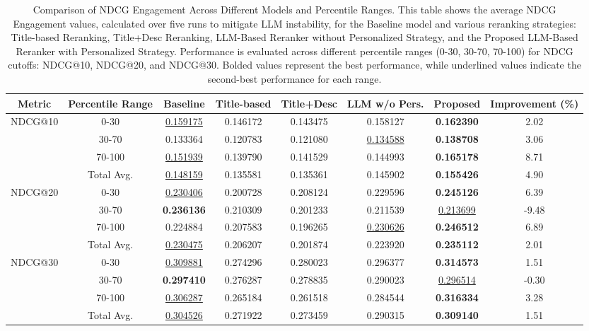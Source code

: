 \begin{table*}[ht]
\centering
\renewcommand{\arraystretch}{1.2} %
\begin{tabular}{|c|c|c|c|c|c|c|c|}
\hline
\textbf{Metric} & \textbf{Percentile Range} & \textbf{Baseline} & \textbf{Title-based} & \textbf{Title+Desc} & \textbf{LLM w/o Pers.} & \textbf{Proposed} & \textbf{Improvement (\%)} \\
\hline
\multirow{3}{*}{NDCG@10} & 0-30    & \underline{0.159175} & 0.146172 & 0.143475 & 0.158127 & \textbf{0.162390} & 2.02 \\
& 30-70   & 0.133364 & 0.120783 & 0.121080 & \underline{0.134588} & \textbf{0.138708} & 3.06 \\
& 70-100  & \underline{0.151939} & 0.139790 & 0.141529 & 0.144993 & \textbf{0.165178} & 8.71 \\
& Total Avg. & \underline{0.148159} & 0.135581 & 0.135361 & 0.145902 & \textbf{0.155426} & 4.90 \\
\hline
\multirow{3}{*}{NDCG@20} & 0-30    & \underline{0.230406} & 0.200728 & 0.208124 & 0.229596 & \textbf{0.245126} & 6.39 \\
& 30-70   & \textbf{0.236136} & 0.210309 & 0.201233 & 0.211539 & \underline{0.213699} & -9.48 \\
& 70-100  & 0.224884 & 0.207583 & 0.196265 & \underline{0.230626} & \textbf{0.246512} & 6.89 \\
& Total Avg. & \underline{0.230475} & 0.206207 & 0.201874 & 0.223920 & \textbf{0.235112} & 2.01 \\
\hline
\multirow{3}{*}{NDCG@30} & 0-30    & \underline{0.309881} & 0.274296 & 0.280023 & 0.296377 & \textbf{0.314573} & 1.51 \\
& 30-70   & \textbf{0.297410} & 0.276287 & 0.278835 & 0.290023 & \underline{0.296514} & -0.30 \\
& 70-100  & \underline{0.306287} & 0.265184 & 0.261518 & 0.284544 & \textbf{0.316334} & 3.28 \\
& Total Avg. & \underline{0.304526} & 0.271922 & 0.273459 & 0.290315 & \textbf{0.309140} & 1.51 \\
\hline
\end{tabular}
\caption{Comparison of NDCG Engagement Across Different Models and Percentile Ranges. This table shows the average NDCG Engagement values, calculated over five runs to mitigate LLM instability, for the Baseline model and various reranking strategies: Title-based Reranking, Title+Desc Reranking, LLM-Based Reranker without Personalized Strategy, and the Proposed LLM-Based Reranker with Personalized Strategy. Performance is evaluated across different percentile ranges (0-30, 30-70, 70-100) for NDCG cutoffs: NDCG@10, NDCG@20, and NDCG@30. Bolded values represent the best performance, while underlined values indicate the second-best performance for each range.}
\label{tab:ndcg_engagement_comparison}
\vskip -0.1in
\end{table*}
